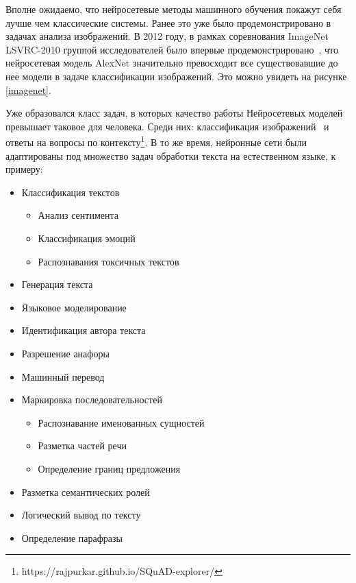 \par Вполне ожидаемо, что нейросетевые методы машинного обучения покажут себя лучше чем классические системы. Ранее это уже было продемонстрировано в задачах анализа изображений. В 2012 году, в рамках соревнования ImageNet LSVRC-2010 группой исследователей было впервые продемонстрировано~\cite{alexnet}, что нейросетевая модель AlexNet значительно превосходит все существовавшие до нее модели в задаче классификации изображений. Это можно увидеть на рисунке \ref{imagenet}.
\par Уже образовался класс задач, в которых качество работы Нейросетевых моделей превышает таковое для человека. Среди них: классификация изображений~\cite{imagenet-human} и ответы на вопросы по контексту\footnote{https://rajpurkar.github.io/SQuAD-explorer/}. В то же время, нейронные сети были адаптированы под множество задач обработки текста на естественном языке, к примеру:
\begin{itemize}
    \item Классификация текстов
        \begin{itemize}
            \item Анализ сентимента
            \item Классификация эмоций
            \item Распознавания токсичных текстов
        \end{itemize}
    \item Генерация текста
    \item Языковое моделирование
    \item Идентификация автора текста
    \item Разрешение анафоры
    \item Машинный перевод
    \item Маркировка последовательностей
        \begin{itemize}
            \item Распознавание именованных сущностей
            \item Разметка частей речи
            \item Определение границ предложения
        \end{itemize}
    \item Разметка семантических ролей
    \item Логический вывод по тексту
    \item Определение парафразы
\end{itemize}

